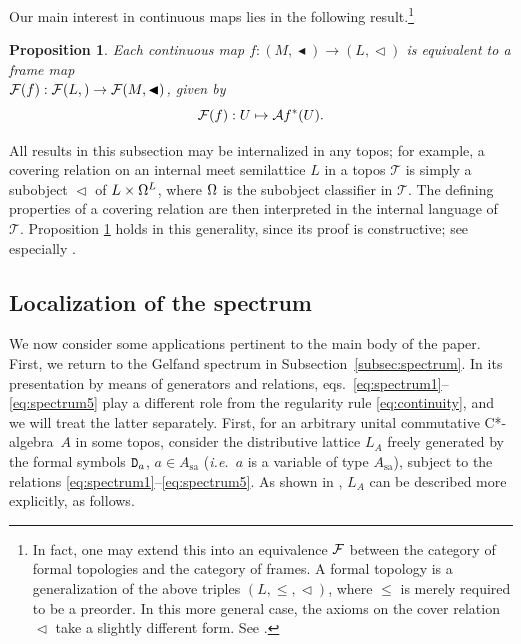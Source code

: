 \documentclass[11pt]{article}
\newcommand{\drie}{\vartriangleleft}
\newcommand{\coveredd}{\ensuremath{\mathop{\blacktriangleleft}}}
\newcommand{\beq}{\begin{equation}}
\newcommand{\eeq}{\end{equation}}
\newcommand{\ca}{C*-algebra} \newcommand{\jba}{JB-algebra}
\newcommand{\raw}{\rightarrow} \newcommand{\rat}{\mapsto}
\newcommand{\x}{\times} \newcommand{\hb}{\hbar}
\newcommand{\er}{\eqref}
\newcommand{\CT}{{\mathcal T}} \newcommand{\CV}{{\mathcal V}}
\newcommand{\sa}{\ensuremath{_{\mathrm{sa}}}}
\newcommand{\prop}[1]{\ensuremath{\mbox{\texttt{#1}}}}
\newcommand{\ie}{\textit{i.e.}}
\newtheorem{proposition}[theorem]{Proposition}
\begin{document}
Our main interest in continuous maps lies in the following result.\footnote{
In fact, one may extend this into an equivalence ${\mathcal F}$ between the category of formal topologies
and the category of frames. A formal topology is a generalization of the above triples
$(L,\leqslant,\drie)$, where $\leqslant$ is merely required to be a preorder. In
this more general case, the axioms on the cover relation $\drie$ take
a slightly different form. See \cite{battilottisambin,negri}.}
\begin{proposition}\label{approxmap}
  Each continuous map  $f:(M,\coveredd)\raw (L,\drie) $ is equivalent  to a
  frame map \\  $\CF(f): \CF(L,\drie)\raw  \CF(M,\coveredd)$, given by
  \beq \CF(f):U\mapsto \mathcal{A}f^*(U).\label{apeq}\eeq
\end{proposition}

All results in this subsection may be internalized in any topos; for example,
a covering relation on an internal meet semilattice $L$ in a topos
$\CT$ is simply a subobject $\drie$ of $L\x\Om^L$, where $\Omega$ is the
subobject classifier in $\CT$. The defining properties of a covering
relation are then interpreted in the internal language of $\CT$.
 Proposition \ref{approxmap} holds in this generality,  since
its proof is constructive; see especially \cite{aczel}.
\subsection{Localization of the spectrum}\label{App:localization}
We now consider some applications pertinent to the main body of the paper.
First, we return to the Gelfand spectrum in
Subsection~\ref{subsec:spectrum}. In its presentation by means of generators and relations,
eqs.\  \er{eq:spectrum1}--\er{eq:spectrum5} play a different role from the regularity rule \er{eq:continuity}, and we will treat the latter separately. First, for an arbitrary unital commutative \ca\ $A$ in some topos, consider
the  distributive lattice $L_A$ freely generated by the formal symbols $\prop{D}_a$, $a\in A\sa$
(\ie\ $a$ is a variable of type $A\sa$), 
subject to the relations \er{eq:spectrum1}--\er{eq:spectrum5}. As shown in \cite{coquand05,
coquandspitters05}, $L_A$ can be described more explicitly, as follows.
\end{document}
